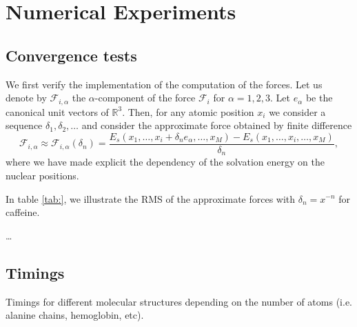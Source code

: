 \section{Numerical Experiments}\label{sec:experiments}
\subsection{Convergence tests}
We first verify the implementation of the computation of the forces.
Let us denote by $	\mathcal{F}_{i,\alpha}$ the $\alpha$-component of the force  $	\mathcal{F}_{i}$ for $\alpha=1,2,3$. Let $e_\alpha$ be the canonical unit vectors of $\mathbb R^3$.
Then, for any atomic position $x_i$ we consider a sequence $\delta_1,\delta_2,\ldots$ and consider the approximate force obtained by finite difference
\[
	\mathcal{F}_{i,\alpha}
	\approx
	\mathcal{F}_{i,\alpha}(\delta_n)
	= 
	\frac{E_s(x_1,\ldots,x_i + \delta_n e_\alpha,\ldots,x_M) - E_s(x_1,\ldots,x_i,\ldots,x_M)}{\delta_n},
\]
where we have made explicit the dependency of the solvation energy on the nuclear positions.

In table \ref{tab:}, we illustrate the RMS of the approximate forces with $\delta_n = x^{-n}$ 
for caffeine.

\ldots


\subsection{Timings}
Timings for different molecular structures depending on the number of atoms (i.e. alanine chains, hemoglobin, etc).